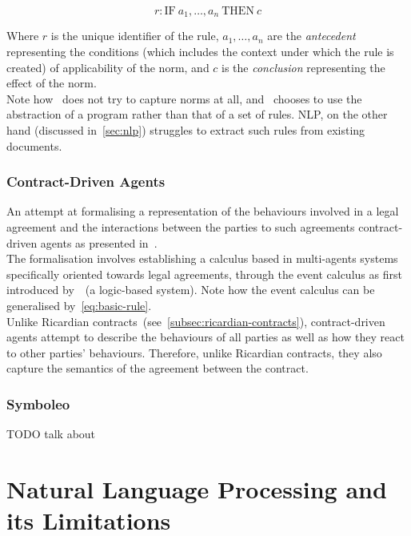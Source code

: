 \begin{equation}
    \label{eq:basic-rule}
    r: \text{IF} \  a_{1}, \dots ,a_n \ \text{THEN} \ c
\end{equation}

Where $r$ is the unique identifier of the rule, $a_1, \dots, a_n $ are the \emph{antecedent} representing the conditions (which includes the context under which the rule is created) of applicability of the norm, and $c$ is the \emph{conclusion} representing the effect of the norm.\\

Note how~ does not try to capture norms at all, and~ chooses to use the abstraction of a program rather than that of a set of rules.
NLP, on the other hand (discussed in~\autoref{sec:nlp}) struggles to extract such rules from existing documents.

\subsubsection{Contract-Driven Agents}\label{subsubsec:contract-driven-agents}

An attempt at formalising a representation of the behaviours involved in a legal agreement and the interactions between the parties to such agreements contract-driven agents as presented in~\cite{knottenbeltContractDriven}.\\

The formalisation involves establishing a calculus based in multi-agents systems specifically oriented towards legal agreements, through the event calculus as first introduced by~\cite{kowalski1989logicEventBased}~(a logic-based system).
Note how the event calculus can be generalised by~\autoref{eq:basic-rule}.\\

Unlike Ricardian contracts~(see~\autoref{subsec:ricardian-contracts}), contract-driven agents attempt to describe the behaviours of all parties as well as how they react to other parties' behaviours.
Therefore, unlike Ricardian contracts, they also capture the semantics of the agreement between the contract.


\subsubsection{Symboleo}

TODO talk about~\cite{symboleo2020}


\section{Natural Language Processing and its Limitations}\label{sec:nlp}

